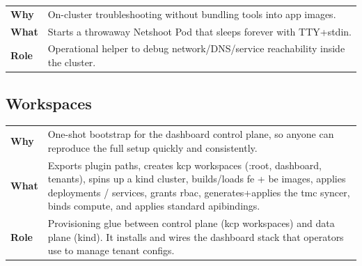 \documentclass[11pt, a4paper, oneside, listof=totoc]{scrartcl}
\makeatletter
\newcommand{\codesummary}[3]{%
    \vspace{0.4\baselineskip}%
    \noindent\begin{tabularx}{\linewidth}{@{}>{\bfseries}l X@{}}
    Why  & #1\\
    What & #2\\
    Role & #3\\
    \end{tabularx}%
    \vspace{0.2\baselineskip}%
}
\makeatother
\begin{document}
        \clearpage

                \codesummary
                    {On-cluster troubleshooting without bundling tools into app images.}
                    {Starts a throwaway Netshoot Pod that sleeps forever with TTY+stdin.}
                    {Operational helper to debug network/DNS/service reachability inside the cluster.}

        \clearpage

            \subsection{Workspaces}
                \codesummary
                    {One-shot bootstrap for the dashboard control plane, so anyone can reproduce the full setup quickly and consistently.}
                    {Exports plugin paths, creates \gls{kcp} workspaces (:root, dashboard, tenants), spins up a \gls{kind} cluster, builds/loads \gls{fe} + \gls{be} images, applies deployments / services, grants \gls{rbac}, generates+applies the \gls{tmc} syncer, binds compute, and applies standard \glspl{apibinding}.}
                    {Provisioning glue between control plane (\gls{kcp} workspaces) and data plane (\gls{kind}). It installs and wires the dashboard stack that operators use to manage tenant configs.}
\end{document}
